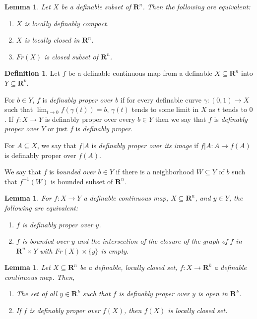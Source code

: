 \documentclass{amsart}
\newtheorem{lemma}[theorem]{Lemma}
\theoremstyle{definition}
\newtheorem{definition}[theorem]{Definition}
\numberwithin{equation}{section}
\begin{document}
\begin{lemma}
  Let $X$ be a definable subset of $\mathbf{R}^n$.
  Then the following are equivalent:
  \begin{enumerate}[label = {(\roman*)}]
    \item $X$ is locally definably compact.
    \item $X$ is locally closed in $\mathbf{R}^n$.
    \item $Fr(X)$ is closed subset of $\mathbf{R}^n$.
  \end{enumerate}
\end{lemma}

\begin{definition}
  Let $f$ be a definable continuous map from a definable $X \subseteq \mathbf{R}^n$ into $Y \subseteq \mathbf{R}^k$.

  For $b \in Y$, $f$ is \emph{definably proper over $b$} if for every definable curve $\gamma:(0,1) \to X$ such that $\lim_{t\to 0} f(\gamma(t)) = b$,
  $\gamma(t)$ tends to some limit in $X$ as $t$ tends to $0$.
  If $f: X \to Y$ is definably proper over every $b\in Y$ then
  we say that $f$ is \emph{definably proper over $Y$} or just
  $f$ is \emph{definably proper}.

  For $A \subseteq X$, we say that $f|A$ is \emph{definably proper over its image} if $f|A : A \to f(A)$ is definably proper over $f(A)$.

  We say that $f$ is \emph{bounded over $b\in Y$} if there is a neighborhood $W \subseteq Y$ of $b$ such that $f^{-1}(W)$ is bounded subset of $\mathbf{R}^n$.
\end{definition}

\begin{lemma}
  For $f: X \to Y$ a definable continuous map,
  $X \subseteq \mathbf{R}^n$,
  and $y\in Y$, the following are equivalent:
  \begin{enumerate}[label = {(\roman*)}]
    \item $f$ is definably proper over $y$.
    \item $f$ is bounded over $y$ and the intersection of the closure of the graph of $f$
      in $\mathbf{R}^n\times Y$ with $Fr(X)\times \{y\}$ is empty.
  \end{enumerate}
\end{lemma}

\begin{lemma}
  Let $X \subseteq \mathbf{R}^n$ be a definable,
  locally closed set, $f: X \to \mathbf{R}^k$ a definable
  continuous map. Then,
  \begin{enumerate}[label = {(\roman*)}]
    \item The set of all $y \in \mathbf{R}^k$ such that $f$ is definably proper over $y$ is open in $\mathbf{R}^k$.
    \item If $f$ is definably proper over $f(X)$, then $f(X)$ is locally closed set.
  \end{enumerate}
\end{lemma}
\end{document}
